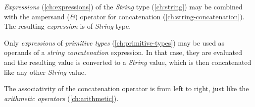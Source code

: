 \emph{Expressions} (\ref{ch:expressions}) of the \emph{String} type (\ref{ch:string})
may be combined with the ampersand (\emph{\&}) operator
for concatenation (\ref{ch:string-concatenation}).
The resulting \emph{expression} is of \emph{String} type.

Only \emph{expressions} of \emph{primitive types} (\ref{ch:primitive-types})
may be used as operands of a \emph{string concatenation} expression.
In that case,
they are evaluated and the resulting value is converted to a \emph{String} value,
which is then concatenated like any other \emph{String} value.

The associativity of the concatenation operator is from left to right,
just like the \emph{arithmetic operators} (\ref{ch:arithmetic}).
